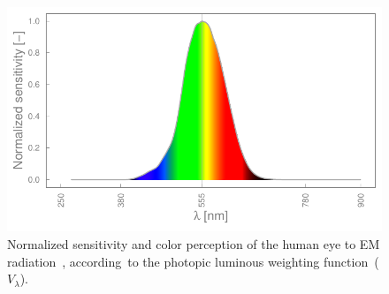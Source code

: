 \documentclass[energies,article,accept,moreauthors,pdftex]{Definitions/mdpi}\usepackage[]{graphicx}\usepackage[]{color}
\makeatletter
\def\maxwidth{ %
  \ifdim\Gin@nat@width>\linewidth
    \linewidth
  \else
    \Gin@nat@width
  \fi
}
\newenvironment{knitrout}{}{} %
\providecommand{\DIFaddbeginFL}{} %
\providecommand{\DIFaddendFL}{} %
\providecommand{\DIFdelbeginFL}{} %
\providecommand{\DIFdelendFL}{} %
\newcommand{\DIFscaledelfig}{0.5}
\newlength{\DIFdelgraphicswidth} %
\newlength{\DIFdelgraphicsheight} %
\newcommand{\DIFaddincludegraphics}[2][]{{\color{blue}\fbox{\DIFOincludegraphics[#1]{#2}}}} %
\newcommand{\DIFdelincludegraphics}[2][]{%
\sbox{\DIFdelgraphicsbox}{\DIFOincludegraphics[#1]{#2}}%
\settoboxwidth{\DIFdelgraphicswidth}{\DIFdelgraphicsbox} %
\settoboxtotalheight{\DIFdelgraphicsheight}{\DIFdelgraphicsbox} %
\scalebox{\DIFscaledelfig}{%
\parbox[b]{\DIFdelgraphicswidth}{\usebox{\DIFdelgraphicsbox}\\[-\baselineskip] \rule{\DIFdelgraphicswidth}{0em}}\llap{\resizebox{\DIFdelgraphicswidth}{\DIFdelgraphicsheight}{%
\setlength{\unitlength}{\DIFdelgraphicswidth}%
\begin{picture}(1,1)%
\thicklines\linethickness{2pt} %
{\color[rgb]{1,0,0}\put(0,0){\framebox(1,1){}}}%
{\color[rgb]{1,0,0}\put(0,0){\line( 1,1){1}}}%
{\color[rgb]{1,0,0}\put(0,1){\line(1,-1){1}}}%
\end{picture}%
}\hspace*{3pt}}} %
} %
\DeclareRobustCommand{\DIFaddbeginFL}{\DIFOaddbeginFL \let\includegraphics\DIFaddincludegraphics} %
\DeclareRobustCommand{\DIFaddendFL}{\DIFOaddendFL \let\includegraphics\DIFOincludegraphics} %
\DeclareRobustCommand{\DIFdelbeginFL}{\DIFOdelbeginFL \let\includegraphics\DIFdelincludegraphics} %
\DeclareRobustCommand{\DIFdelendFL}{\DIFOaddendFL \let\includegraphics\DIFOincludegraphics} %
\makeatother
\begin{document}
\begin{knitrout}
\color{fgcolor}
\begin{figure}[H]

{\centering \includegraphics[width=\maxwidth]{figure/Vis_Graph-1} 

}

\DIFdelbeginFL %
\DIFdelendFL \DIFaddbeginFL \caption[Normalized sensitivity and color perception of the human eye to EM radiation~\cite{schubert2006}, according to the photopic luminous weighting function~($V_\lambda$)]{\DIFaddendFL Normalized sensitivity and color perception of the human eye to EM radiation~\cite{schubert2006}, \mbox{according to} the photopic luminous weighting function~($V_\lambda$). }\label{fig:Vis_Graph}
\end{figure}


\end{knitrout}
\end{document}
